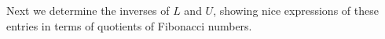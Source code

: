 \documentclass[12pt]{article}
\newtheorem{proposition}[theorem]{Proposition}
\begin{document}
Next we determine the inverses of $L$ and  $U$, showing nice expressions of these entries in terms of quotients of Fibonacci numbers.



\end{document}
